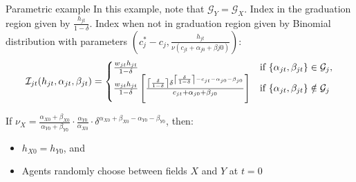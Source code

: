 \begin{frame}{Parametric example}
In this example, note that $\mathcal{G}_Y = \mathcal{G}_X$. Index in the graduation region given by $\frac{h_{jt}}{1 - \delta}$. Index when not in graduation region given by Binomial distribution with parameters $\left(c_j^* - c_j, \frac{h_{jt}}{\nu(c_{jt} + \alpha_{j0} + \beta{j0})}\right)$:
\begin{align*}
\mathcal{I}_{jt} (h_{jt}, \alpha_{jt}, \beta_{jt}) = 
\begin{cases}
\frac{w_{jt} h_{jt}}{1 - \delta} & \text{if } \{\alpha_{jt}, \beta_{jt}\} \in \mathcal{G}_{j}, \\
\frac{w_{jt} h_{jt}}{1 - \delta} \left[ 
   \frac{
      \left\lceil \frac{\delta}{1 - \delta} \right\rceil
      \delta^{\left\lceil \frac{\delta}{1 - \delta} \right\rceil - c_{jt} - \alpha_{j0} - \beta_{j0}}}
   {c_{jt} + \alpha_{j0} + \beta_{j0}}
    \right] & \text{if } \{\alpha_{jt}, \beta_{jt}\} \notin \mathcal{G}_{j} \\
\end{cases}
\end{align*}

\hyperlink{simulate}{}
\hyperlink{sim_beliefs}{}

\end{frame}


\begin{frame}{}\label{app_ability_v_effect}

If 
$\nu_X = 
\frac{\alpha_{X0} + \beta_{X0}}{\alpha_{Y0} + \beta_{Y0}} 
\cdot \frac{\alpha_{Y0}}{\alpha_{X0}}
\cdot \delta^{\alpha_{X0} + \beta_{X0} - \alpha_{Y0} - \beta_{Y0}}$, then:
\begin{itemize}
     \item $h_{X0} = h_{Y0}$, and
     \item Agents randomly choose between fields $X$ and $Y$ at $t=0$
 \end{itemize}  
\begin{figure}
\centering

\end{figure}
\hyperlink{app_v_effects}{}
\hyperlink{sim_beliefs}{}

\end{frame}


